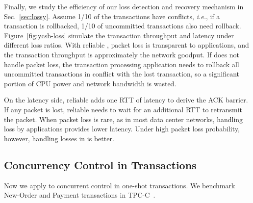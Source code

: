 
Finally, we study the efficiency of our loss detection and recovery mechanism in Sec.~\ref{sec:lossy}.
Assume 1/10 of the transactions have conflicts, \textit{i.e.}, if a transaction is rollbacked, 1/10 of uncommitted transactions also need rollback.
Figure~\ref{fig:ycsb-loss} simulate the transaction throughput and latency under different loss ratios.
With reliable \sys, packet loss is transparent to applications, and the transaction throughput is approximately the network goodput.
If \sys does not handle packet loss, the transaction processing application needs to rollback all uncommitted transactions in conflict with the lost transaction, so a significant portion of CPU power and network bandwidth is wasted.

On the latency side, reliable \sys adds one RTT of latency to derive the ACK barrier.
If any packet is lost, reliable \sys needs to wait for an additional RTT to retransmit the packet.
When packet loss is rare, as in most data center networks, handling loss by applications provides lower latency.
Under high packet loss probability, however, handling losses in \sys is better.

\subsection{Concurrency Control in Transactions}
\label{subsec:eval-transactions}

Now we apply \sys to concurrent control in one-shot transactions.
We benchmark New-Order and Payment transactions in TPC-C~\cite{tpcc}.



